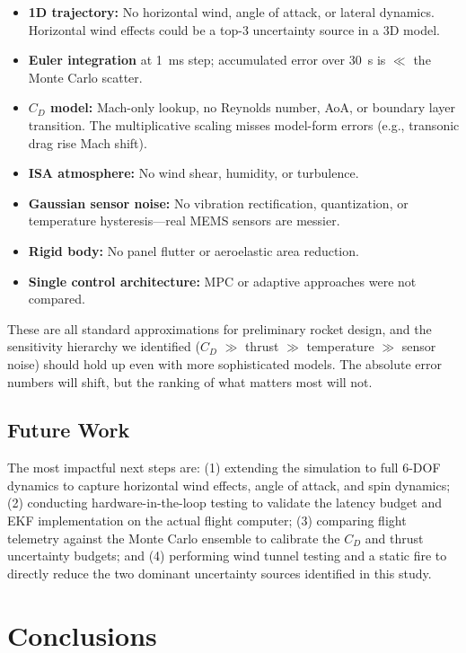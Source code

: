\documentclass[11pt,letterpaper]{article}
\newcommand{\Cd}{C_D}
\begin{document}
\begin{itemize}[nosep]
    \item \textbf{1D trajectory:} No horizontal wind, angle of attack, or lateral dynamics. Horizontal wind effects could be a top-3 uncertainty source in a 3D model.
    \item \textbf{Euler integration} at 1~ms step; accumulated error over 30~s is $\ll$ the Monte Carlo scatter.
    \item \textbf{$\Cd$ model:} Mach-only lookup, no Reynolds number, AoA, or boundary layer transition. The multiplicative scaling misses model-form errors (e.g., transonic drag rise Mach shift).
    \item \textbf{ISA atmosphere:} No wind shear, humidity, or turbulence.
    \item \textbf{Gaussian sensor noise:} No vibration rectification, quantization, or temperature hysteresis---real MEMS sensors are messier.
    \item \textbf{Rigid body:} No panel flutter or aeroelastic area reduction.
    \item \textbf{Single control architecture:} MPC or adaptive approaches were not compared.
\end{itemize}

These are all standard approximations for preliminary rocket design, and the sensitivity hierarchy we identified ($\Cd$ $\gg$ thrust $\gg$ temperature $\gg$ sensor noise) should hold up even with more sophisticated models. The absolute error numbers will shift, but the ranking of what matters most will not.

\subsection{Future Work}
\label{sec:future_work}

The most impactful next steps are: (1) extending the simulation to full 6-DOF dynamics to capture horizontal wind effects, angle of attack, and spin dynamics; (2) conducting hardware-in-the-loop testing to validate the latency budget and EKF implementation on the actual flight computer; (3) comparing flight telemetry against the Monte Carlo ensemble to calibrate the $\Cd$ and thrust uncertainty budgets; and (4) performing wind tunnel testing and a static fire to directly reduce the two dominant uncertainty sources identified in this study.


\section{Conclusions}
\label{sec:conclusions}
\end{document}

